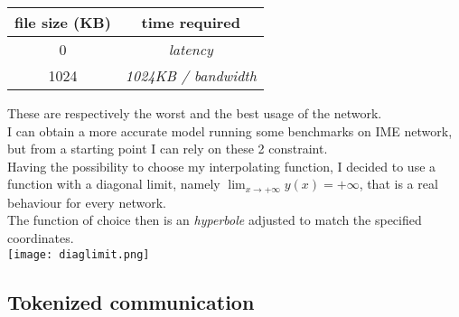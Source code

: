\vspace{0.5cm}
\begin{tabular}{c | c}
    file size (KB) & time required \\ \hline
    0 & \textit{latency} \\ \hline
    1024 & \textit{1024KB / bandwidth}
\end{tabular}
\vspace{0.5cm}

These are respectively the worst and the best usage of the network. \\
I can obtain a more accurate model running some benchmarks on IME network, but
from a starting point I can rely on these 2 constraint. \\
Having the possibility to choose my interpolating function, I decided to use a
function with a diagonal limit, namely $\lim_{x \to +\infty} y(x) = +\infty$, that is a real behaviour
for every network. \\
The function of choice then is an \textit{hyperbole} adjusted to match the
specified coordinates. \\
\texttt{[image: diaglimit.png]}


\subsection{Tokenized communication}
